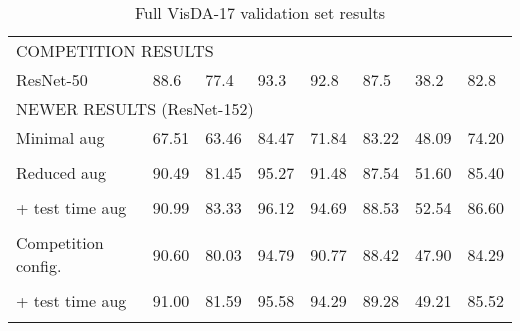 \documentclass{article}
\begin{document}
\begin{table}[!t]
\begin{center}
\begin{tabular}{llllllll}
\multicolumn{8}{l}{COMPETITION RESULTS} \\

\rule{0pt}{2.5ex}ResNet-50      & 88.6      & 77.4      & 93.3      & 92.8      & 87.5      & 38.2      & 82.8 \\

\hline

\multicolumn{8}{l}{NEWER RESULTS (ResNet-152)} \\

\rule{0pt}{2.5ex}Minimal aug        & 67.51     & 63.46     & 84.47     & 71.84     & 83.22     & 48.09     & 74.20     \\
                                    &   &   &   &   &   &   &  \\


\rule{0pt}{2.5ex}Reduced aug        & 90.49     & 81.45     & 95.27     & 91.48     & 87.54     & 51.60     & 85.40     \\
                                    &   &   &   &   &   &   &  \\

\rule{0pt}{2.5ex}+ test time aug    & 90.99     & 83.33     & 96.12     & 94.69     & 88.53     & 52.54     & 86.60     \\
                                    &   &   &   &   &   &   &  \\


\rule{0pt}{2.5ex}Competition config.& 90.60     & 80.03     & 94.79     & 90.77     & 88.42     & 47.90     & 84.29     \\
                                    &   &   &   &   &   &   &  \\

\rule{0pt}{2.5ex}+ test time aug    & 91.00     & 81.59     & 95.58     & 94.29     & 89.28     & 49.21     & 85.52     \\
                                    &   &   &   &   &   &   &  \\



\hline
\hline

\end{tabular}

\caption{Full VisDA-17 validation set results}
\label{tab:visda_val_full}
\end{center}
\end{table}
\end{document}
